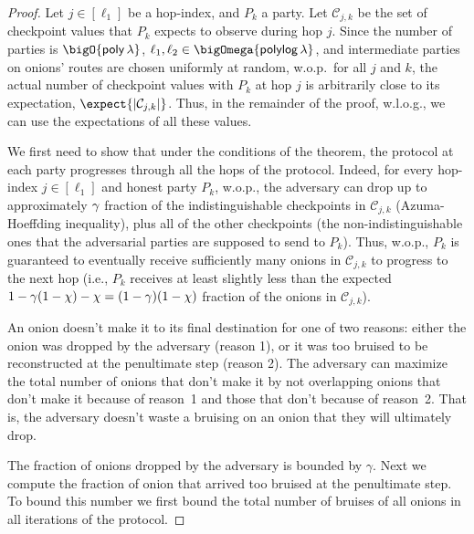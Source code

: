 \documentclass[runningheads,a4paper]{llncs}
\begin{document}
\begin{proof}

Let $j \in [\ell_1]$ be a hop-index, and $P_k$ a party.
Let $\mathcal{C}_{j, k}$ be the set of checkpoint values that $P_k$ expects to observe during hop $j$. Since the number of parties is $\bigO{\mathsf{poly}\thinspace\secpar}$, $\ell_1, \ell_2 \in \bigOmega{\polylog\thinspace\secpar}$, and intermediate parties on onions' routes are chosen uniformly at random, w.o.p.\ for all $j$ and $k$, the actual number of checkpoint values with $P_k$ at hop $j$ is arbitrarily close to its expectation, $\expect{|\mathcal{C}_{j, k}|}$. Thus, in the remainder of the proof, w.l.o.g., we can use the expectations of all these values.

We first need to show that under the conditions of the theorem, the protocol at each party progresses through all the hops of the protocol. Indeed,
for every hop-index $j \in [\ell_1]$ and honest party $P_k$, w.o.p., 
the adversary can drop up to approximately $\gamma$ fraction of the indistinguishable checkpoints in $\mathcal{C}_{j,k}$ (Azuma-Hoeffding inequality), plus all of the other checkpoints (the non-indistinguishable ones that the adversarial parties are supposed to send to $P_k$). 
Thus, w.o.p., $P_k$ is guaranteed to eventually receive sufficiently many onions in $\mathcal{C}_{j, k}$ to progress to the next hop (i.e., $P_k$ receives at least slightly less than the expected $1 - \gamma(1-\chi) - \chi = (1 - \gamma)(1-\chi) $ fraction of the onions in $\mathcal{C}_{j, k}$). 

An onion doesn't make it to its final destination for one of two reasons: either the onion was dropped by the adversary (reason 1), or it was too bruised to be reconstructed at the penultimate step (reason 2). 
The adversary can maximize the total number of onions that don't make it by not overlapping onions that don't make it because of reason~1 and those that don't because of reason~2. That is, the adversary doesn't waste a bruising on an onion that they will ultimately drop. 

The fraction of onions dropped by the adversary is bounded by $\gamma$. Next we compute the fraction of onion that arrived too bruised at the penultimate step. To bound this number we first bound the total number of bruises of all onions in all iterations of the protocol.


\end{proof}
\end{document}
